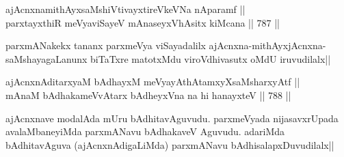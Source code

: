
\begin{shl}
ajAcnxnamithAyxsaMshiVtivayxtireVkeVNa nAparamf || \\
parxtayxthiR meVyaviSayeV mAnaseyxVhAsitx kiMcana ||  787 ||  
\end{shl}

\begin{artha} 
parxmANakekx tananx parxmeVya viSayadalilx 
ajAcnxna-mithAyxjAcnxna-saMshayagaLanunx biTaTxre matotxMdu 
viroVdhivasutx oMdU iruvudilalx||
\end{artha}


\begin{shl}
ajAcnxnAditarxyaM bAdhayxM meVyayAthAtamxyXsaMsharxyAtf || \\
mAnaM bAdhakameVvAtarx bAdheyxVna na hi hanayxteV ||  788 ||  
\end{shl}

\begin{artha} 
ajAcnxnave modalAda mUru bAdhitavAguvudu. parxmeVyada nijasavxrUpada 
avalaMbaneyiMda parxmANavu bAdhakaveV Aguvudu. adariMda bAdhitavAguva 
(ajAcnxnAdigaLiMda) parxmANavu bAdhisalapxDuvudilalx||
\end{artha}
